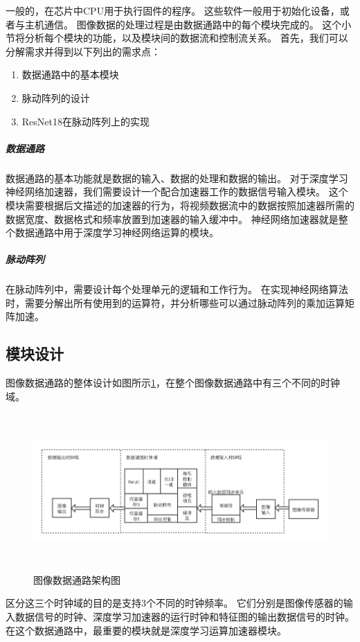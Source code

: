 一般的，在芯片中CPU用于执行固件的程序。
这些软件一般用于初始化设备，或者与主机通信。
图像数据的处理过程是由数据通路中的每个模块完成的。
这个小节将分析每个模块的功能，以及模块间的数据流和控制流关系。
首先，我们可以分解需求并得到以下列出的需求点：
\begin{enumerate}
    \item 数据通路中的基本模块
    \item 脉动阵列的设计
    \item ResNet18在脉动阵列上的实现
\end{enumerate}    

\subparagraph{数据通路}
数据通路的基本功能就是数据的输入、数据的处理和数据的输出。
对于深度学习神经网络加速器，我们需要设计一个配合加速器工作的数据信号输入模块。
这个模块需要根据后文描述的加速器的行为，将视频数据流中的数据按照加速器所需的数据宽度、数据格式和频率放置到加速器的输入缓冲中。
神经网络加速器就是整个数据通路中用于深度学习神经网络运算的模块。

\subparagraph{脉动阵列}
在脉动阵列中，需要设计每个处理单元的逻辑和工作行为。
在实现神经网络算法时，需要分解出所有使用到的运算符，并分析哪些可以通过脉动阵列的乘加运算矩阵加速。


\subsection{模块设计}
图像数据通路的整体设计如图所示\ref{fig:image_datapath}，在整个图像数据通路中有三个不同的时钟域。
\begin{figure}[htbp]
    \centering
    \includegraphics[width=15cm,height=6cm]{figures/image_datapath.png}
    \caption{图像数据通路架构图}
    \label{fig:image_datapath}
\end{figure}
区分这三个时钟域的目的是支持3个不同的时钟频率。
它们分别是图像传感器的输入数据信号的时钟、深度学习加速器的运行时钟和特征图的输出数据信号的时钟。
在这个数据通路中，最重要的模块就是深度学习运算加速器模块。


